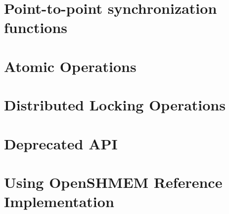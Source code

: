 \documentclass[10pt]{book}
\begin{document}
\section*{Point-to-point synchronization functions}%
\startchap
\section*{Atomic Operations}
\startchap
\section*{Distributed Locking Operations}
\startchap
\section*{Deprecated API}
\startchap
\section*{ Using OpenSHMEM Reference Implementation}
\end{document}
